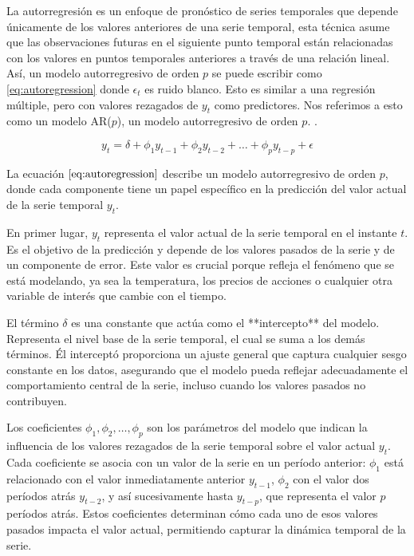 La autorregresión es un enfoque de pronóstico de series temporales que depende únicamente de los valores anteriores de una serie temporal, esta técnica asume que las observaciones futuras en el siguiente punto temporal están relacionadas con los valores en puntos temporales anteriores a través de una relación lineal. Así, un modelo autorregresivo de orden \( p \) se puede escribir como \eqref{eq:autoregression} donde \( \epsilon_t \) es ruido blanco. Esto es similar a una regresión múltiple, pero con valores rezagados de \( y_t \) como predictores. Nos referimos a esto como un modelo AR(\( p \)), un modelo autorregresivo de orden \( p \). \cite{hyndman}.

\begin{equation}
y_t = \delta + \phi_1 y_{t-1} + \phi_2 y_{t-2} + \ldots + \phi_p y_{t-p} + \epsilon
\label{eq:autoregression}
\end{equation}

La ecuación \(\eqref{eq:autoregression}\) describe un modelo autorregresivo de orden \(p\), donde cada componente tiene un papel específico en la predicción del valor actual de la serie temporal \(y_t\).

En primer lugar, \(y_t\) representa el valor actual de la serie temporal en el instante \(t\). Es el objetivo de la predicción y depende de los valores pasados de la serie y de un componente de error. Este valor es crucial porque refleja el fenómeno que se está modelando, ya sea la temperatura, los precios de acciones o cualquier otra variable de interés que cambie con el tiempo.

El término \(\delta\) es una constante que actúa como el **intercepto** del modelo. Representa el nivel base de la serie temporal, el cual se suma a los demás términos. Él interceptó proporciona un ajuste general que captura cualquier sesgo constante en los datos, asegurando que el modelo pueda reflejar adecuadamente el comportamiento central de la serie, incluso cuando los valores pasados no contribuyen.

Los coeficientes \(\phi_1, \phi_2, \ldots, \phi_p\) son los parámetros del modelo que indican la influencia de los valores rezagados de la serie temporal sobre el valor actual \(y_t\). Cada coeficiente se asocia con un valor de la serie en un período anterior: \(\phi_1\) está relacionado con el valor inmediatamente anterior \(y_{t-1}\), \(\phi_2\) con el valor dos períodos atrás \(y_{t-2}\), y así sucesivamente hasta \(y_{t-p}\), que representa el valor \(p\) períodos atrás. Estos coeficientes determinan cómo cada uno de esos valores pasados impacta el valor actual, permitiendo capturar la dinámica temporal de la serie.

